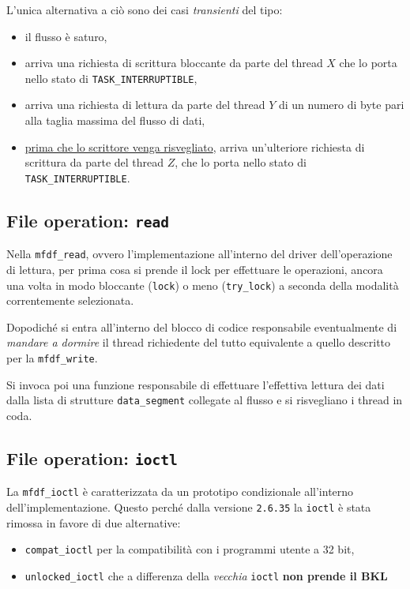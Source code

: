 \documentclass{article}
\begin{document}
L'unica alternativa a ciò sono dei casi \textit{transienti} del tipo:
\begin{itemize}
        \item il flusso è saturo,
        \item arriva una richiesta di scrittura bloccante da parte del thread $X$ che lo porta nello stato di \texttt{TASK\_INTERRUPTIBLE},
        \item arriva una richiesta di lettura da parte del thread $Y$ di un numero di byte pari alla taglia massima del flusso di dati,
        \item \ul{prima che lo scrittore venga risvegliato}, arriva un'ulteriore richiesta di scrittura da parte del thread $Z$, che lo porta nello stato di \texttt{TASK\_INTERRUPTIBLE}.
\end{itemize}

\subsection*{File operation: \texttt{read}}
Nella \texttt{mfdf\_read}, ovvero l'implementazione all'interno del driver dell'operazione di lettura, per prima cosa si prende il lock per effettuare le operazioni, ancora una volta in modo bloccante (\texttt{lock}) o meno (\texttt{try\_lock}) a seconda della modalità correntemente selezionata.

Dopodiché si entra all'interno del blocco di codice responsabile eventualmente di \textit{mandare a dormire} il thread richiedente del tutto equivalente a quello descritto per la \texttt{mfdf\_write}.

Si invoca poi una funzione responsabile di effettuare l'effettiva lettura dei dati dalla lista di strutture \texttt{data\_segment} collegate al flusso e si risvegliano i thread in coda.
\subsection{File operation: \texttt{ioctl}}
La \texttt{mfdf\_ioctl} è caratterizzata da un prototipo condizionale all'interno dell'implementazione. Questo perché dalla versione \texttt{2.6.35} la \texttt{ioctl} è stata rimossa in favore di due alternative:
\begin{itemize}
        \item \texttt{compat\_ioctl} per la compatibilità con i programmi utente a 32 bit,
        \item \texttt{unlocked\_ioctl} che a differenza della \textit{vecchia} \texttt{ioctl} \textbf{non prende il BKL}
\end{itemize}
\end{document}
